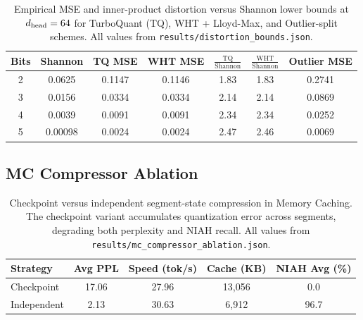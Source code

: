 \begin{table}[H]
\centering
\caption{Empirical MSE and inner-product distortion versus Shannon lower
bounds at $d_{\text{head}} = 64$ for TurboQuant (TQ), WHT + Lloyd-Max, and
Outlier-split schemes.
All values from \texttt{results/distortion\_bounds.json}.}
\label{tab:distortion_bounds}
\small
\begin{tabular}{@{}ccccccc@{}}
\toprule
\textbf{Bits} & \textbf{Shannon} & \textbf{TQ MSE} & \textbf{WHT MSE}
  & \textbf{$\frac{\text{TQ}}{\text{Shannon}}$}
  & \textbf{$\frac{\text{WHT}}{\text{Shannon}}$}
  & \textbf{Outlier MSE} \\
\midrule
2 & 0.0625 & 0.1147 & 0.1146 & 1.83 & 1.83 & 0.2741 \\
3 & 0.0156 & 0.0334 & 0.0334 & 2.14 & 2.14 & 0.0869 \\
4 & 0.0039 & 0.0091 & 0.0091 & 2.34 & 2.34 & 0.0252 \\
5 & 0.00098 & 0.0024 & 0.0024 & 2.47 & 2.46 & 0.0069 \\
\bottomrule
\end{tabular}
\end{table}

\subsection{MC Compressor Ablation}

\begin{table}[H]
\centering
\caption{Checkpoint versus independent segment-state compression
in Memory Caching.
The checkpoint variant accumulates quantization error across segments,
degrading both perplexity and NIAH recall.
All values from \texttt{results/mc\_compressor\_ablation.json}.}
\label{tab:ablation}
\small
\begin{tabular}{@{}lcccc@{}}
\toprule
\textbf{Strategy} & \textbf{Avg PPL} & \textbf{Speed (tok/s)}
  & \textbf{Cache (KB)} & \textbf{NIAH Avg (\%)} \\
\midrule
Checkpoint & 17.06 & 27.96 & 13{,}056 & 0.0 \\
Independent & 2.13 & 30.63 & 6{,}912 & 96.7 \\
\bottomrule
\end{tabular}
\end{table}

